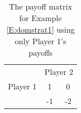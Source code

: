 \begin{example}



\begin{table}[h]
\centering

\begin{tabular}{ccc}
                      & \multicolumn{2}{c}{Player 2}                                                  \\ \cline{2-3} 
\multicolumn{1}{l|}{Player 1}  & \multicolumn{1}{c|}{1} & \multicolumn{1}{c|}{0} \\ \cline{2-3} 
\multicolumn{1}{l|}{}  & \multicolumn{1}{c|}{-1} & \multicolumn{1}{c|}{-2} \\ \cline{2-3} 
\end{tabular}
\caption{The payoff matrix for Example \ref{E:domstrat1} using only Player 1's payoffs}
\label{T:smallexampleP1}
\end{table}

\end{example}


